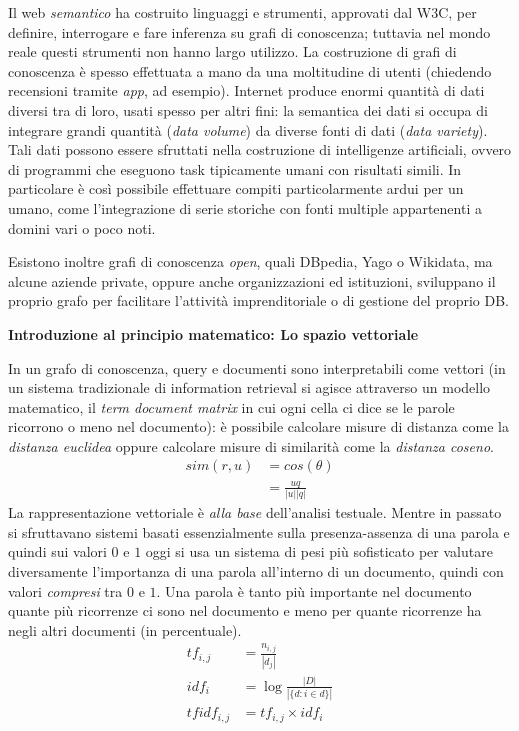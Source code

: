 \documentclass[11pt]{article}
\begin{document}
Il web \textit{semantico} ha costruito linguaggi e strumenti, approvati dal W3C, per definire, interrogare e fare inferenza su grafi di conoscenza; tuttavia nel mondo reale questi strumenti non hanno largo utilizzo.
La costruzione di grafi di conoscenza è spesso effettuata a mano da una moltitudine di utenti (chiedendo recensioni tramite \textit{app}, ad esempio).
Internet produce enormi quantità di dati diversi tra di loro, usati spesso per altri fini: la semantica dei dati si occupa di integrare grandi quantità (\textit{data volume}) da diverse fonti di dati (\textit{data variety}).
Tali dati possono essere sfruttati nella costruzione di intelligenze artificiali, ovvero di programmi che eseguono task tipicamente umani con risultati simili.
In particolare è così possibile effettuare compiti particolarmente ardui per un umano, come l'integrazione di serie storiche con fonti multiple appartenenti a domini vari o poco noti.

Esistono inoltre grafi di conoscenza \textit{open}, quali DBpedia, Yago o Wikidata, ma alcune aziende private, oppure anche organizzazioni ed istituzioni, sviluppano il proprio grafo per facilitare l'attività imprenditoriale o di gestione del proprio DB.
\newline
\newline
\begin{itshape}
\textbf{Introduzione al principio matematico: Lo spazio vettoriale}
\end{itshape}

In un grafo di conoscenza, query e documenti sono interpretabili come vettori (in un sistema tradizionale di information retrieval si agisce attraverso un modello matematico, il \textit{term document matrix} in cui ogni cella ci dice se le parole ricorrono o meno nel documento): è possibile calcolare misure di distanza come la \textit{distanza euclidea} oppure calcolare misure di similarità come la \textit{distanza coseno}.
\begin{align*}
  sim(r, u) &= cos(\theta) \\
            &= \frac{u q}{|u| |q|}
  \end{align*}
La rappresentazione vettoriale è \textit{alla base} dell'analisi testuale.
Mentre in passato si sfruttavano sistemi basati essenzialmente sulla presenza-assenza di una parola e quindi sui valori $0$ e $1$ oggi si usa un sistema di pesi più sofisticato per valutare diversamente l'importanza di una parola all'interno di un documento, quindi con valori \textit{compresi} tra $0$ e $1$.
Una parola è tanto più importante nel documento quante più ricorrenze ci sono nel documento e meno per quante ricorrenze ha negli altri documenti (in percentuale).
\begin{align*}
  tf_{i, j} &= \frac{n_{i,j}}{|d_j|} \\
  idf_i &= \log{\frac{|D|}{|\{d : i \in d\}|}} \\
  tfidf_{i, j} &= tf_{i, j} \times idf_i
\end{align*}
\end{document}

